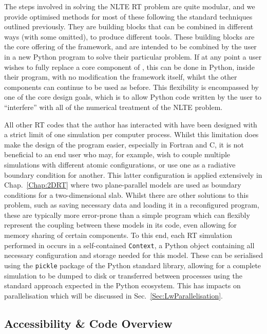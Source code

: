 The steps involved in solving the NLTE RT problem are quite modular, and we provide optimised methods for most of these following the standard techniques outlined previously.
They are building blocks that can be combined in different ways (with some omitted), to produce different tools.
These building blocks are the core offering of the \Lw{} framework, and are intended to be combined by the user in a new Python program to solve their particular problem.
If at any point a user wishes to fully replace a core component of \Lw{}, this can be done in Python, inside their program, with no modification the framework itself, whilst the other components can continue to be used as before.
This flexibility is encompassed by one of the core design goals, which is to allow Python code written by the user to ``interfere'' with all of the numerical treatment of the NLTE problem.

All other RT codes that the author has interacted with have been designed with a strict limit of one simulation per computer process.
Whilst this limitation does make the design of the program easier, especially in Fortran and C, it is not beneficial to an end user who may, for example, wish to couple multiple simulations with different atomic configurations, or use one as a radiative boundary condition for another.
This latter configuration is applied extensively in Chap.~\ref{Chap:2DRT} where two plane-parallel models are used as boundary conditions for a two-dimensional slab.
Whilst there are other solutions to this problem, such as saving necessary data and loading it in a reconfigured program, these are typically more error-prone than a simple program which can flexibly represent the coupling between these models in its code, even allowing for memory sharing of certain components.
To this end, each RT simulation performed in \Lw{} occurs in a self-contained \texttt{Context}, a Python object containing all necessary configuration and storage needed for this model.
These can be serialised using the \texttt{pickle} package of the Python standard library, allowing for a complete simulation to be dumped to disk or transferred between processes using the standard approach expected in the Python ecosystem.
This has impacts on parallelisation which will be discussed in Sec.~\ref{Sec:LwParallelisation}.

\subsection{Accessibility \& Code Overview}

